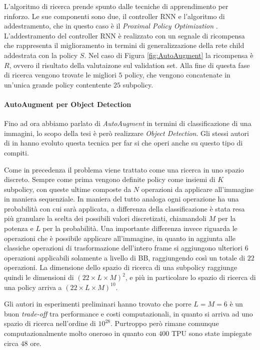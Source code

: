 L'algoritmo di ricerca prende spunto dalle tecniche di apprendimento per rinforzo. Le sue componenti sono due, il controller \ac{RNN} e l'algoritmo di addestramento, che in questo caso è il \textit{Proximal Policy Optimization} \cite{DBLP:journals/corr/SchulmanWDRK17}. L'addestramento del controller \ac{RNN} è realizzato con un segnale di ricompensa che rappresenta il miglioramento in termini di generalizzazione della rete child addestrata con la policy $S$. Nel caso di Figura \ref{fig:AutoAugment} la ricompensa è $R$, ovvero il risultato della valutaizone sul validation set. Alla fine di questa fase di ricerca vengono trovate le migliori $5$ policy, che vengono concatenate in un'unica grande policy contentente $25$ subpolicy.
\paragraph{AutoAugment per Object Detection}
Fino ad ora abbiamo parlato di \textit{AutoAugment} in termini di classificazione di una immagini, lo scopo della tesi è però realizzare \textit{Object Detection}. Gli stessi autori di \cite{DBLP:journals/corr/abs-1805-09501} in \cite{DBLP:journals/corr/abs-1906-11172} hanno evoluto questa tecnica per far si che operi anche su questo tipo di compiti.

Come in precedenza il problema viene trattato come una ricerca in uno spazio discreto. Sempre come prima vengono definite policy come insiemi di $K$ subpolicy, con queste ultime composte da $N$ operazioni da applicare all'immagine in maniera sequenziale. In maniera del tutto analoga ogni operazione ha una probabilità con cui sarà applicata, a differenza della classificazione è stata resa più granulare la scelta dei possibili valori discretizati, chiamandoli $M$ per la potenza e $L$ per la probabilità. 
Una importante differenza invece riguarda le operazioni che è possibile applicare all'immagine, in quanto in aggiunta alle classiche operazioni di trasformazione dell'intero frame si aggiungono ulteriori $6$ operazioni applicabili solamente a livello di \ac{BB}, raggiungendo così un totale di $22$ operazioni. La dimensione dello spazio di ricerca di una subpolicy raggiunge quindi le dimensioni di $(22 \times L \times M)^2$, e più in particolare lo spazio di ricerca di una policy arriva a $(22 \times L \times M)^{10}$.

Gli autori in esperimenti preliminari hanno trovato che porre $L = M = 6$ è un buon \textit{trade-off} tra performance e costi computazionali, in quanto si arriva ad uno spazio di ricerca nell'ordine di $10^{28}$. Purtroppo però rimane comunque computazionalmente molto oneroso in quanto con $400$ \ac{TPU} sono state impiegate circa $48$ ore. 

